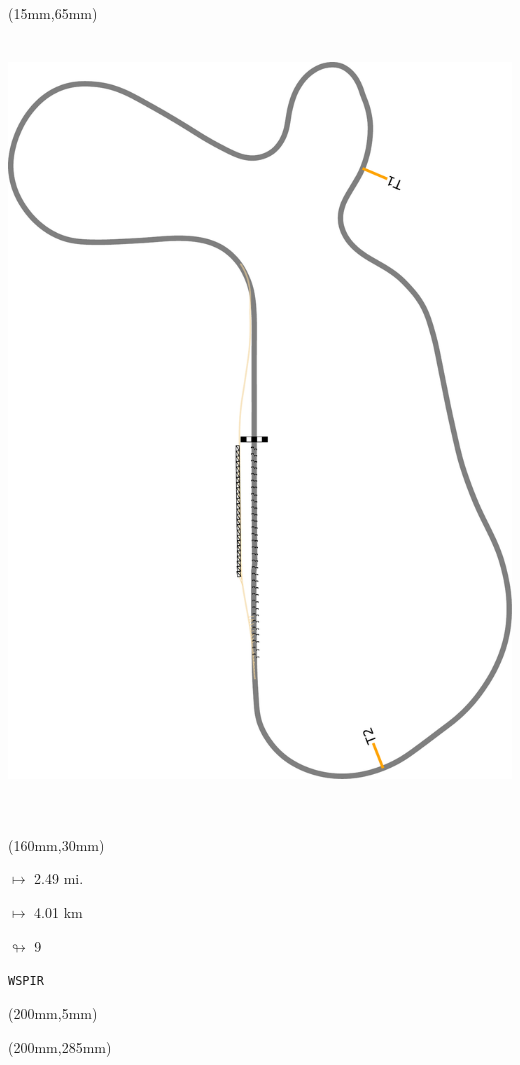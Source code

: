 \begin{textblock*}{185mm}(15mm,65mm)%
\centering
\mbox{\includegraphics[width=185mm,height=210mm,keepaspectratio]{PT/WSPIR.pdf}}
\end{textblock*}
\begin{textblock*}{40mm}(160mm,30mm)%
\Large
\par$\mapsto$ 2.49 mi.
\par$\mapsto$ 4.01 km
\par$\looparrowright$ 9
\par\hfill\tiny\tt WSPIR\\
\end{textblock*}
\begin{textblock*}{20mm}(200mm,5mm)%
\fbox{\thepage}
\label{WSPIR}
\end{textblock*}
\begin{textblock*}{20mm}(200mm,285mm)%
\fbox{\thepage}
\end{textblock*}

